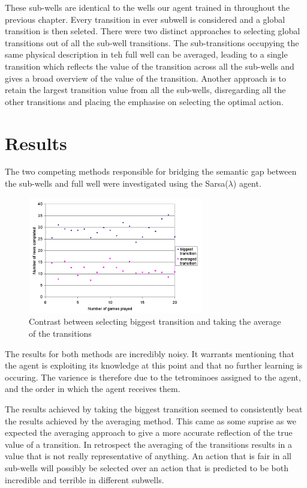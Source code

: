 \documentclass{rucsthesis}
\begin{document}
These sub-wells are identical to the wells our agent trained in throughout the previous chapter. Every transition in ever subwell is considered and a global transition is then seleted. There were two distinct approaches to selecting global transitions out of all the sub-well transitions. The sub-transitions occupying the same physical description in teh full well can be averaged, leading to a single transition which reflects the value of the transition across all the sub-wells and gives a broad overview of the value of the transition. Another approach is to retain the largest transition value from all the sub-wells, disregarding all the other transitions and placing the emphasise on selecting the optimal action.

\section{Results}

The two competing methods responsible for bridging the semantic gap between the sub-wells and full well were investigated using the Sarsa($\lambda$) agent.

\begin{figure}[h]
\centering
\includegraphics[width=3in]{multisingle.png}
\caption{Contrast between selecting biggest transition and taking the average of the transitions}
\label{fig:multisingle}
\end{figure}

The results for both methods are incredibly noisy. It warrants mentioning that the agent is exploiting its knowledge at this point and that no further learning is occuring. The varience is therefore due to the tetrominoes assigned to the agent, and the order in which the agent receives them.

The results achieved by taking the biggest transition seemed to consistently beat the results achieved by the averaging method. This came as some suprise as we expected the averaging approach to give a more accurate reflection of the true value of a transition. In retrospect the averaging of the transitions results in a value that is not really representative of anything. An action that is fair in all sub-wells will possibly be selected over an action that is predicted to be both incredible and terrible in different subwells.
\end{document}
